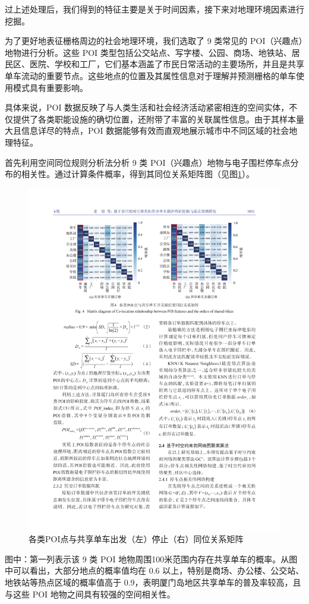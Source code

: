 \documentclass[12pt,a4paper,oneside]{ctexart}
\begin{document}
过上述处理后，我们得到的特征主要是关于时间因素，接下来对地理环境因素进行挖掘。

为了更好地表征栅格周边的社会地理环境，我们选取了 9 类常见的 POI（兴趣点）地物进行分析。这些 POI 类型包括公交站点、写字楼、公园、商场、地铁站、居民区、医院、学校和工厂，它们基本涵盖了市民日常活动的主要场所，并且是共享单车流动的重要节点。这些地点的位置及其属性信息对于理解并预测栅格的单车使用模式具有重要影响。

具体来说，POI 数据反映了与人类生活和社会经济活动紧密相连的空间实体，不仅提供了各类职能设施的确切位置，还附带了丰富的关联属性信息。由于其样本量大且信息详尽的特点，POI 数据能够有效而直观地展示城市中不同区域的社会地理特征。


首先利用空间同位规则分析法分析 9 类 POI（兴趣点）地物与电子围栏停车点分布的相关性。通过计算条件概率，得到其同位关系矩阵图（见图\ref{fig:POI}）。
\begin{figure}[H]
    \centering
    \includegraphics[width=\textwidth]{Figs/各类POI点与共享单车出发停止同位关系矩阵.pdf}
    \caption{各类POI点与共享单车出发（左）停止（右）同位关系矩阵}
    \label{fig:POI}
\end{figure}
图中：第一列表示该 9 类 POI 地物周围100米范围内存在共享单车的概率。从图中可以看出，大部分地点的概率值均在 0.6 以上，特别是商场、办公楼、公交站、地铁站等热点区域的概率值高于 0.9，表明厦门岛地区共享单车的普及率较高，且与这些 POI 地物之间具有较强的空间相关性。
\end{document}
